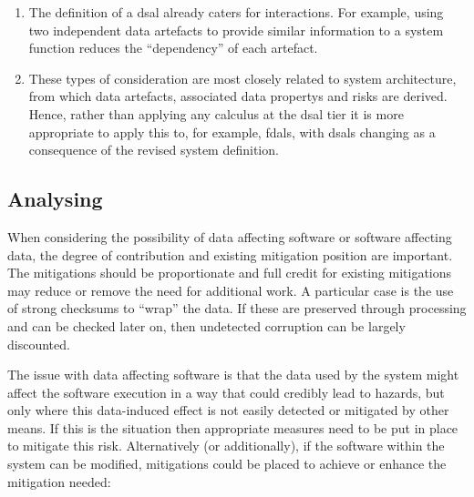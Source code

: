 \begin{enumerate}
  \item The definition of a \gls{dsal} already caters for interactions. For example, using two independent \glspl{data artefact} to provide similar \gls{information} to a system function reduces the ``dependency'' of each artefact.
  \item These types of consideration are most closely related to system architecture, from which \glspl{data artefact}, associated \glspl{data property} and risks are derived. Hence, rather than applying any calculus at the \gls{dsal} tier it is more appropriate to apply this to, for example, \glspl{fdal}, with \glspl{dsal} changing as a consequence of the revised system definition.
\end{enumerate}

\subsection{Analysing }
When considering the possibility of data affecting software or software affecting data, the degree of contribution and existing \gls{mitigation} position are important. The \glspl{mitigation} should be proportionate and full credit for existing \glspl{mitigation} may reduce or remove the need for additional work. A particular case is the use of strong checksums to ``wrap'' the data. If these are preserved through processing and can be checked later on, then undetected  corruption can be largely discounted.

The issue with data affecting software is that the data used by the system might affect the software execution in a way that could credibly lead to \glspl{hazard}, but only where this data-induced effect is not easily detected or mitigated by other means. If this is the situation then appropriate measures need to be put in place  to mitigate this risk. Alternatively (or additionally), if the software within the system can be modified, \glspl{mitigation} could be placed  to achieve or enhance the \gls{mitigation} needed:

